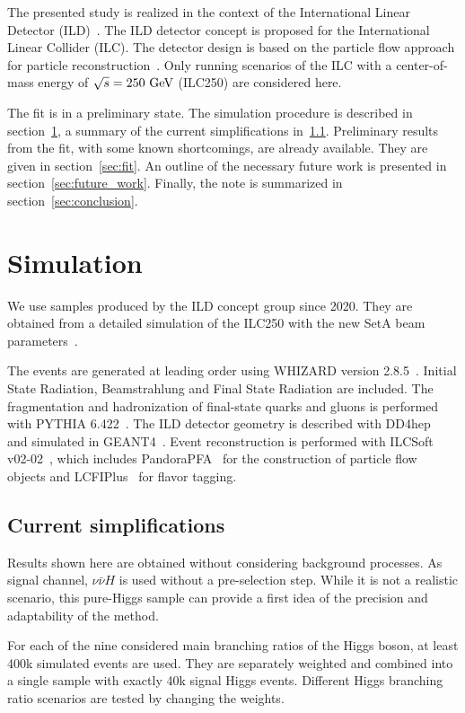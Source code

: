 \documentclass[11pt, hidelinks, a4paper]{scrartcl}
\newcommand{\eV}{\text{e\kern-0.15ex V}\xspace}
\newcommand{\GeV}{\text{G\eV}\xspace}
\begin{document}
The presented study is realized in the context of the
International Linear Detector (ILD)~\cite{ILD_DBD,ILD_IDR}.
The ILD detector concept is proposed for the International Linear Collider (ILC).
The detector design is based on the particle flow approach
for particle reconstruction~\cite{ParticleFlow}.
Only running scenarios of the ILC
with a center-of-mass energy of $\sqrt{s}=250~\GeV$ (ILC250)
are considered here.

The fit is in a preliminary state.
The simulation procedure is described in section~\ref{sec:simulation},
a summary of the
current simplifications in~\ref{subsec:simplifications}.
Preliminary results from the fit,
with some known shortcomings, are already available.
They are given in section~\ref{sec:fit}.
An outline of the necessary future work is presented
in section~\ref{sec:future_work}.
Finally, the note is summarized in section~\ref{sec:conclusion}.

\section{Simulation}\label{sec:simulation}
We use samples produced by the ILD concept group since 2020.
They are obtained from a detailed simulation of the ILC250
with the new SetA beam parameters~\cite{ILC_Staging_2017}.

The events are generated at leading order using
WHIZARD version 2.8.5~\cite{whizard,omega}.
Initial State Radiation, Beamstrahlung and Final State Radiation are included.
The fragmentation and hadronization of final-state quarks and gluons
is performed with PYTHIA 6.422~\cite{pythia}.
The ILD detector geometry is described with DD4hep~\cite{DD4hep}
and simulated in GEANT4~\cite{GEANT4}.
Event reconstruction is performed with ILCSoft v02-02~\cite{ILCSoft},
which includes PandoraPFA~\cite{PandoraPFA} for
the construction of particle flow objects
and LCFIPlus~\cite{LCFIPlus} for flavor tagging.

\subsection{Current simplifications}\label{subsec:simplifications}
Results shown here are obtained without considering background processes.
As signal channel, $\nu \bar{\nu} H$ is used without a pre-selection step.
While it is not a realistic scenario,
this pure-Higgs sample can provide a first idea
of the precision and adaptability of the method.

For each of the nine considered main branching ratios of the Higgs boson,
at least 400k simulated events are used.
They are separately weighted and combined into a single sample
with exactly 40k signal Higgs events.
Different Higgs branching ratio scenarios are tested by changing the weights.
\end{document}
